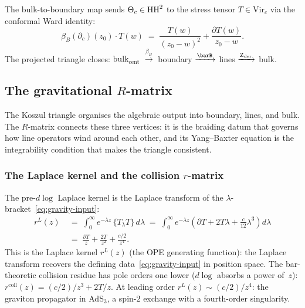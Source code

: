 The bulk-to-boundary map sends $\Theta_c \in \operatorname{HH}^2$ to the
stress tensor $T \in \mathrm{Vir}_c$ via the conformal Ward identity:
\begin{equation}\label{eq:gravity-bulk-boundary}
\beta_B(\partial_c)(z_0) \cdot T(w)
\;=\;
\frac{T(w)}{(z_0 - w)^2} + \frac{\partial T(w)}{z_0 - w}.
\end{equation}
The projected triangle closes:
$\mathrm{bulk}_{\mathrm{cent}}$ $\xrightarrow{\beta_B}$ boundary
$\xrightarrow{\barB}$ lines $\xrightarrow{\operatorname{Z}_{\mathrm{der}}}$ bulk.


\subsection{The gravitational $R$-matrix}
\label{subsec:gravity-r-matrix}

The Koszul triangle organises the algebraic output
into boundary, lines, and bulk. The $R$-matrix connects these
three vertices: it is the braiding datum that governs how line
operators wind around each other, and its Yang--Baxter equation is
the integrability condition that makes the triangle consistent.

\subsubsection*{The Laplace kernel and the collision $r$-matrix}

The pre-\(d\log\) Laplace kernel is the Laplace transform of the
$\lambda$-bracket~\eqref{eq:gravity-input}:
\begin{align*}
r^L(z)
&\;=\;
\int_0^\infty e^{-\lambda z}\,
 \{T{}_\lambda T\}\, d\lambda
\;=\;
\int_0^\infty e^{-\lambda z}\!\left(
 \partial T + 2T\lambda + \frac{c}{12}\lambda^3
\right) d\lambda
\\[4pt]
&\;=\;
\frac{\partial T}{z} + \frac{2T}{z^2} + \frac{c/2}{z^4}.
\end{align*}
This is the Laplace kernel $r^L(z)$ (the OPE generating function):
the Laplace transform recovers
the defining data~\eqref{eq:gravity-input} in position space.
The bar-theoretic collision residue has pole orders one lower
($d\log$ absorbs a power of~$z$):
$r^{\mathrm{coll}}(z) = (c/2)/z^3 + 2T/z$.
At leading order $r^L(z) \sim (c/2)/z^4$: the graviton propagator
in AdS$_3$, a spin-$2$ exchange with a fourth-order singularity.

